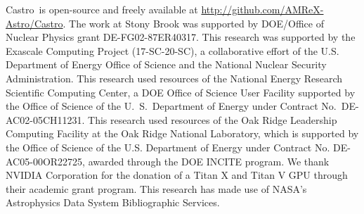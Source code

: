 \documentclass[preprint,times,tighten,linenumbers,trackchanges]{aastex631}
\newcommand{\castro}{{\sf Castro}}
\begin{document}
\begin{acknowledgements}
\castro\ is open-source and freely available at
\url{http://github.com/AMReX-Astro/Castro}.  The work at Stony Brook was supported by DOE/Office
of Nuclear Physics grant DE-FG02-87ER40317. This research was supported by the Exascale Computing 
Project (17-SC-20-SC), a collaborative effort of the U.S. Department of Energy
Office of Science and the National Nuclear Security Administration. This research used
resources of the National Energy Research Scientific Computing Center,
a DOE Office of Science User Facility supported by the Office of
Science of the U.~S.\ Department of Energy under Contract
No.\ DE-AC02-05CH11231.  This research used resources of the Oak Ridge
Leadership Computing Facility at the Oak Ridge National Laboratory,
which is supported by the Office of Science of the U.S. Department of
Energy under Contract No. DE-AC05-00OR22725, awarded through the DOE
INCITE program.  We thank NVIDIA Corporation for the donation of a
Titan X and Titan V GPU through their academic grant program.  This
research has made use of NASA's Astrophysics Data System Bibliographic
Services.
\end{acknowledgements}







\end{document}
